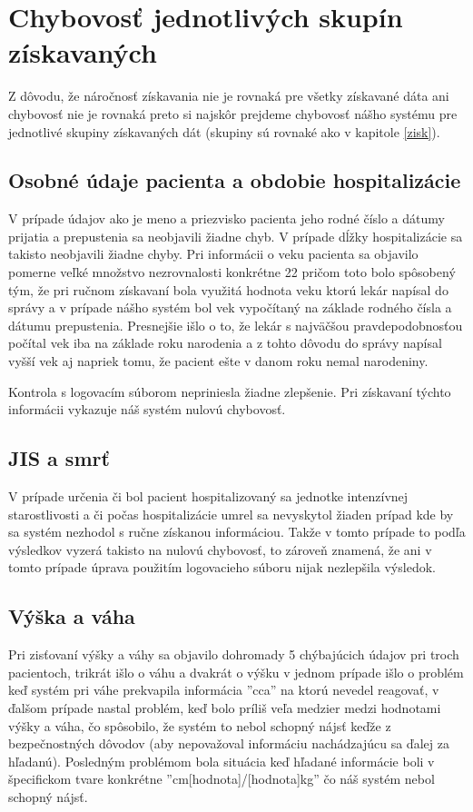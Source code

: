 \section{Chybovosť jednotlivých skupín získavaných}

Z dôvodu, že náročnosť získavania nie je rovnaká pre všetky získavané dáta ani chybovosť nie je rovnaká preto si najskôr prejdeme chybovosť nášho systému pre jednotlivé skupiny získavaných dát (skupiny sú rovnaké ako v kapitole \ref{zisk}).

\subsection{Osobné údaje pacienta a obdobie hospitalizácie}

V prípade údajov ako je meno a priezvisko pacienta jeho rodné číslo a dátumy prijatia a prepustenia sa neobjavili žiadne chyb. V prípade dĺžky hospitalizácie sa takisto neobjavili žiadne chyby. Pri informácii o veku pacienta sa objavilo pomerne veľké množstvo nezrovnalosti konkrétne 22 pričom toto bolo spôsobený tým, že pri ručnom získavaní bola využitá hodnota veku ktorú lekár napísal do správy a v prípade nášho systém bol vek vypočítaný na základe rodného čísla a dátumu prepustenia. Presnejšie išlo o to, že lekár s najväčšou pravdepodobnosťou počítal vek iba na základe roku narodenia a z tohto dôvodu do správy napísal vyšší vek aj napriek tomu, že pacient ešte v danom roku nemal narodeniny.

Kontrola s logovacím súborom nepriniesla žiadne zlepšenie. Pri získavaní týchto informácii vykazuje náš systém nulovú chybovosť.

\subsection{JIS a smrť}

V prípade určenia či bol pacient hospitalizovaný sa jednotke intenzívnej starostlivosti a či počas hospitalizácie umrel sa nevyskytol žiaden prípad kde by sa systém nezhodol s ručne získanou informáciou. Takže v tomto prípade to podľa výsledkov vyzerá takisto na nulovú chybovosť, to zároveň znamená, že ani v tomto prípade úprava použitím logovacieho súboru nijak nezlepšila výsledok. 

\subsection{Výška a váha}

Pri zisťovaní výšky a váhy sa objavilo dohromady 5 chýbajúcich údajov pri troch pacientoch, trikrát išlo o váhu a dvakrát o výšku v jednom prípade išlo o problém keď systém pri váhe prekvapila informácia ''cca'' na ktorú nevedel reagovať, v ďalšom prípade nastal problém, keď bolo príliš veľa medzier medzi hodnotami výšky a váha, čo spôsobilo, že systém to nebol schopný nájsť keďže z bezpečnostných dôvodov (aby nepovažoval informáciu nachádzajúcu sa ďalej za hľadanú). Posledným problémom bola situácia keď hľadané informácie boli v špecifickom tvare konkrétne ''cm[hodnota]/[hodnota]kg'' čo náš systém nebol schopný nájsť.

